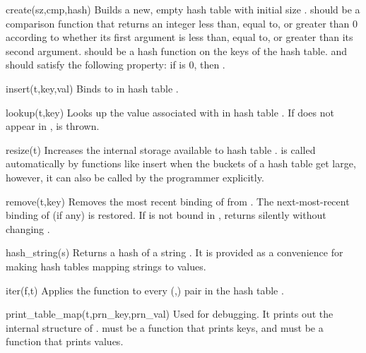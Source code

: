 \begin{defun}{create}{(sz,cmp,hash)}
Builds a new, empty hash table with initial size .  
should be a comparison function that returns an integer less than, equal
to, or greater than 0 according to whether its first argument is less
than, equal to, or greater than its second argument.   should
be a hash function on the keys of the hash table.   and
 should satisfy the following property: if
 is 0, then .
\end{defun}

\begin{defun}{insert}{(t,key,val)}
Binds  to  in hash table .
\end{defun}

\begin{defun}{lookup}{(t,key)}
Looks up the value associated with  in hash table .  If
 does not appear in ,  is thrown.
\end{defun}


\begin{defun}{resize}{(t)}
Increases the internal storage available to hash table .
 is called automatically by functions like insert when the
buckets of a hash table get large, however, it can also be called by the
programmer explicitly.
\end{defun}

\begin{defun}{remove}{(t,key)}
Removes the most recent binding of  from .  The
next-most-recent binding of  (if any) is restored.  If
 is not bound in ,  returns silently
without changing .
\end{defun}


\begin{defun}{hash_string}{(s)}
Returns a hash of a string .  It is provided as a convenience for
making hash tables mapping strings to values.
\end{defun}

\begin{defun}{iter}{(f,t)}
Applies the function  to every (,) pair in
the hash table .
\end{defun}

\begin{defun}{print_table_map}{(t,prn_key,prn_val)}
Used for debugging.  It prints out the internal structure of .
 must be a function that prints keys, and 
must be a function that prints values.
\end{defun}

